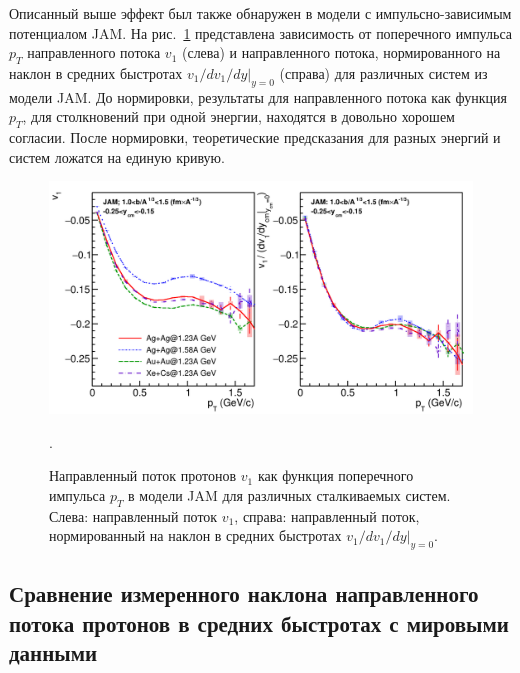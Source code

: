 Описанный выше эффект был также обнаружен в модели с импульсно-зависимым потенциалом JAM.
На рис.~\ref{fig:v1_model_pT_scaling} представлена зависимость от поперечного импульса $p_T$ направленного потока $v_1$ (слева) и направленного потока, нормированного на наклон в средних быстротах $v_1/dv_1/dy|_{y=0}$ (справа) для различных систем из модели JAM.
До нормировки, результаты для направленного потока как функция $p_T$, для столкновений при одной энергии, находятся в довольно хорошем согласии.
После нормировки, теоретические предсказания для разных энергий и систем ложатся на единую кривую. 
\begin{figure}[ht]
\begin{center}
\includegraphics[width=0.9\linewidth]{images/v1_hades_model_pT_scaling.png}
\caption{ 
    Направленный поток протонов $v_1$ как функция поперечного импульса $p_T$ в модели JAM для различных сталкиваемых систем. Слева: направленный поток $v_1$, справа: направленный поток, нормированный на наклон в средних быстротах $v_1/dv_1/dy|_{y=0}$.
}.
\label{fig:v1_model_pT_scaling}
\end{center}
\end{figure}

\subsection{Сравнение измеренного наклона направленного потока протонов в средних быстротах с мировыми данными}

